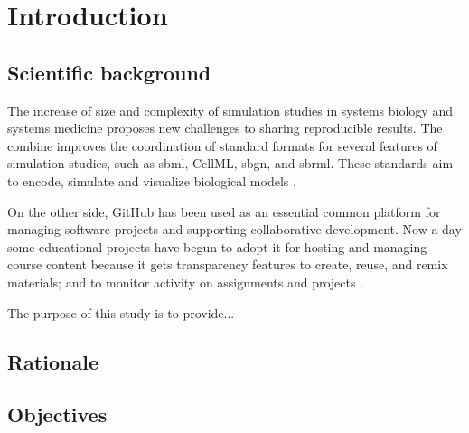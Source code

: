 \section*{Introduction}

\subsection*{Scientific background}
The increase of size and complexity of simulation studies in systems biology and systems medicine proposes new challenges to sharing reproducible results. The \ac{combine} improves the coordination of standard formats for several features of simulation studies, such as \ac{sbml}, CellML, \ac{sbgn}, and \ac{sbrml}. These standards aim to encode, simulate and visualize biological models \cite{combine}.

On the other side, GitHub has been used as an essential common platform for managing software projects and supporting collaborative development. Now a day some educational projects have begun to adopt it for hosting and managing course content because it gets transparency features to create, reuse, and remix materials; and to monitor activity on assignments and projects \cite{github}.

The purpose of this study is to provide...

\subsection*{Rationale}

\subsection*{Objectives}
